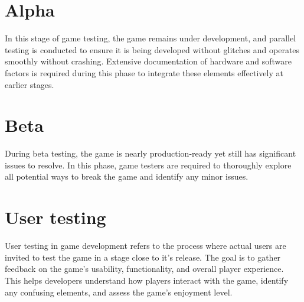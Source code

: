 \documentclass{article}
\begin{document}
\section{Alpha}
In this stage of game testing, the game remains under development, and parallel testing is conducted to ensure it is being developed without glitches and operates smoothly without crashing. Extensive documentation of hardware and software factors is required during this phase to integrate these elements effectively at earlier stages.

\section{Beta}
During beta testing, the game is nearly production-ready yet still has significant issues to resolve. In this phase, game testers are required to thoroughly explore all potential ways to break the game and identify any minor issues.

\section{User testing}
User testing in game development refers to the process where actual users are invited to test the game in a stage close to it's release. The goal is to gather feedback on  the game's usability, functionality, and overall player experience. This helps developers understand how players interact with the game, identify any confusing elements, and assess the game's enjoyment level.
\end{document}
